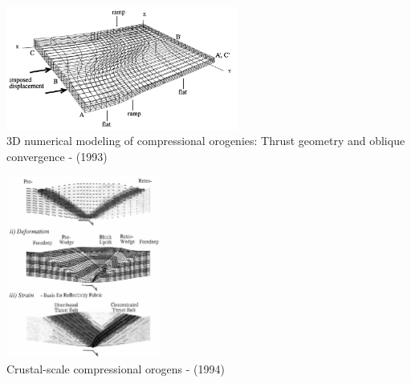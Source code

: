 \begin{center}
\begin{minipage}{0.45\textwidth}
\centering
\includegraphics[width=7.6cm]{images/history/brau93}\\
{\captionfont 3D numerical modeling of
compressional orogenies: Thrust geometry and
oblique convergence - \textcite{brau93} (1993)}
\end{minipage}\hfill
\begin{minipage}{0.45\textwidth}
\centering
\includegraphics[height=6cm]{images/history/bequ94}\\
{\captionfont Crustal-scale compressional orogens - \textcite{bequ94} (1994)}
\end{minipage}
\end{center}

